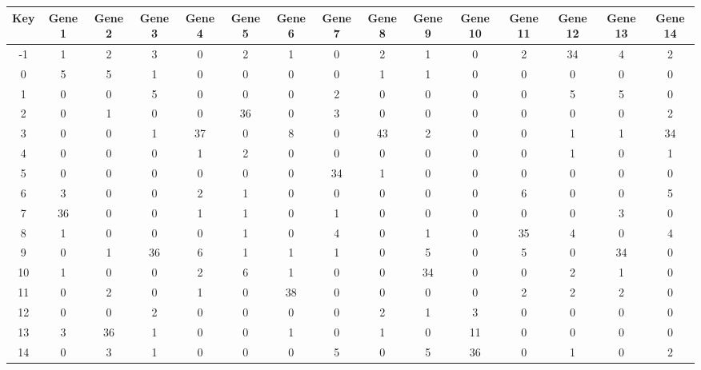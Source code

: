 \begin{tabular}{|c|c|c|c|c|c|c|c|c|c|c|c|c|c|c|}
\hline
Key & Gene 1 & Gene 2 & Gene 3 & Gene 4 & Gene 5 & Gene 6 & Gene 7 & Gene 8 & Gene 9 & Gene 10 & Gene 11 & Gene 12 & Gene 13 & Gene 14 \\
\hline
-1 & 1 & 2 & 3 & 0 & 2 & 1 & 0 & 2 & 1 & 0 & 2 & 34 & 4 & 2 \\
0 & 5 & 5 & 1 & 0 & 0 & 0 & 0 & 1 & 1 & 0 & 0 & 0 & 0 & 0 \\
1 & 0 & 0 & 5 & 0 & 0 & 0 & 2 & 0 & 0 & 0 & 0 & 5 & 5 & 0 \\
2 & 0 & 1 & 0 & 0 & 36 & 0 & 3 & 0 & 0 & 0 & 0 & 0 & 0 & 2 \\
3 & 0 & 0 & 1 & 37 & 0 & 8 & 0 & 43 & 2 & 0 & 0 & 1 & 1 & 34 \\
4 & 0 & 0 & 0 & 1 & 2 & 0 & 0 & 0 & 0 & 0 & 0 & 1 & 0 & 1 \\
5 & 0 & 0 & 0 & 0 & 0 & 0 & 34 & 1 & 0 & 0 & 0 & 0 & 0 & 0 \\
6 & 3 & 0 & 0 & 2 & 1 & 0 & 0 & 0 & 0 & 0 & 6 & 0 & 0 & 5 \\
7 & 36 & 0 & 0 & 1 & 1 & 0 & 1 & 0 & 0 & 0 & 0 & 0 & 3 & 0 \\
8 & 1 & 0 & 0 & 0 & 1 & 0 & 4 & 0 & 1 & 0 & 35 & 4 & 0 & 4 \\
9 & 0 & 1 & 36 & 6 & 1 & 1 & 1 & 0 & 5 & 0 & 5 & 0 & 34 & 0 \\
10 & 1 & 0 & 0 & 2 & 6 & 1 & 0 & 0 & 34 & 0 & 0 & 2 & 1 & 0 \\
11 & 0 & 2 & 0 & 1 & 0 & 38 & 0 & 0 & 0 & 0 & 2 & 2 & 2 & 0 \\
12 & 0 & 0 & 2 & 0 & 0 & 0 & 0 & 2 & 1 & 3 & 0 & 0 & 0 & 0 \\
13 & 3 & 36 & 1 & 0 & 0 & 1 & 0 & 1 & 0 & 11 & 0 & 0 & 0 & 0 \\
14 & 0 & 3 & 1 & 0 & 0 & 0 & 5 & 0 & 5 & 36 & 0 & 1 & 0 & 2 \\
\hline
\end{tabular}